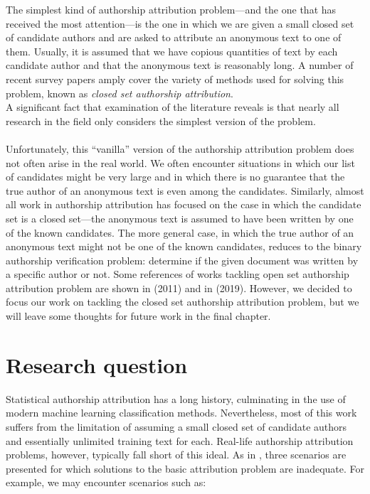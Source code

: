 The simplest kind of authorship attribution problem—and the one that has received the most attention—is the one in which we are given a small closed set of candidate authors and are asked to attribute an anonymous text to one of them. Usually, it is assumed that we have copious quantities of text by each candidate author and that the anonymous text is reasonably long. A number of recent survey papers amply cover the variety of methods used for solving this problem, known as \textit{closed set authorship attribution}.\\
A significant fact that examination of the literature reveals is that nearly all research in the field only considers the simplest version of the problem.\\\\
Unfortunately, this “vanilla” version of the authorship attribution problem does not often arise in the real world. We often encounter situations in which our list of candidates might be very large and in which there is no guarantee that the true author of an anonymous text is even among the candidates. \cite{koppel2012fundamental}
Similarly, almost all work in authorship attribution has focused on the case in which the candidate set is a closed set—the anonymous text is assumed to have been written by one of the known candidates. The more general case, in which the true author of an anonymous text might not be one of the known candidates, reduces to the binary authorship verification problem: determine if the given document was written by a specific author or not.
Some references of works tackling open set authorship attribution problem are shown in \citeauthor{koppel2011authorship} (2011) and in \citeauthor{badirli2019open} (2019).
However, we decided to focus our work on tackling the closed set authorship attribution problem, but we will leave some thoughts for future work in the final chapter.


\section{Research question}

Statistical authorship attribution has a long history, culminating in the use of modern machine learning classification methods. Nevertheless, most of this work suffers from the limitation of assuming a small closed set of candidate authors and essentially unlimited training text for each. Real-life authorship attribution problems, however, typically fall short of this ideal. As in \cite{koppel2009computational}, three scenarios are presented for which solutions to the basic attribution problem are inadequate.
For example, we may encounter scenarios such as:

